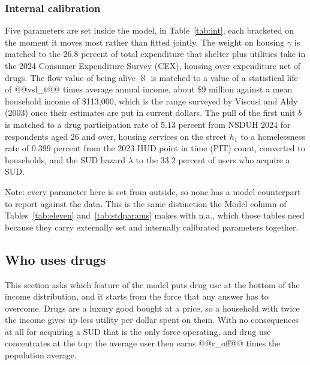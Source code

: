 \documentclass[10pt]{article}
\newcommand{\notes}[2]{\par\vspace{0.4em}%
  \begin{minipage}{#1}\footnotesize #2\end{minipage}}
\newcommand{\tabnote}[1]{\notes{\wd\ntbox}{#1}}
\begin{document}
\subsubsection{Internal calibration}

Five parameters are set inside the model, in Table~\ref{tab:int}, each bracketed
on the moment it moves most rather than fitted jointly. The weight on
housing $\gamma$ is matched to the $26.8$ percent of total expenditure that
shelter plus utilities take in the 2024 Consumer Expenditure Survey (CEX),
housing over expenditure net of drugs. The flow value
of being alive $\aleph$ is matched to a value of a statistical life of @@vsl_t@@
times average annual income, about \$9 million against a mean household income of
\$113,000, which is the range surveyed by Viscusi and Aldy (2003) once their
estimates are put in current dollars. The pull of the first unit $b$ is matched
to a drug participation rate of $5.13$ percent from NSDUH 2024 for
respondents aged 26 and over, housing services on the street
$h_1$ to a homelessness rate of $0.399$ percent from the 2023 HUD point in
time (PIT) count, converted to households, and the SUD hazard $\lambda$ to the $33.2$ percent of users who
acquire a SUD.

\begin{table}[!tb]
\centering
\caption{Externally set parameters}\label{tab:ext}
\sbox{\ntbox}{}\usebox{\ntbox}
\tabnote{Note: every parameter here is set from outside, so none has a model counterpart to report against the data. This is the same distinction the Model column of Tables~\ref{tab:eleven} and~\ref{tab:stdparams} makes with n.a., which those tables need because they carry externally set and internally calibrated parameters together.}
\end{table}

\begin{table}[!tb]
\centering
\caption{Internally calibrated parameters}\label{tab:int}

\end{table}

\subsection{Who uses drugs}\label{sec:who}

This section asks which feature of the model puts drug use at the bottom of the
income distribution, and it starts from the force that any answer has to
overcome. Drugs are a luxury good bought at a price, so a household with
twice the income gives up less utility per dollar spent on them. With no consequences
at all for acquiring a SUD that is the only force operating, and drug use
concentrates at the top: the average user then earns @@r_off@@ times the
population average.
\end{document}
